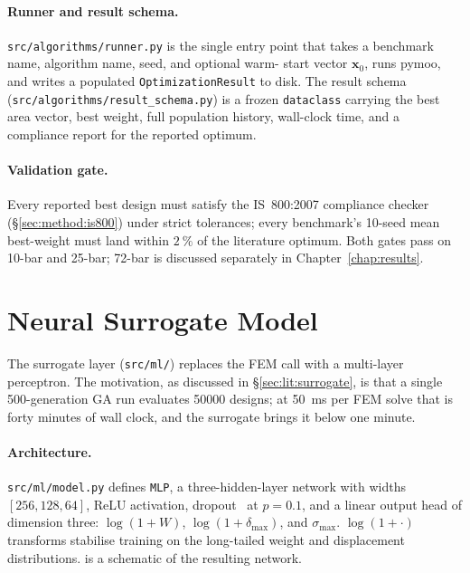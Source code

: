 \paragraph{Runner and result schema.}
\texttt{src/algorithms/runner.py} is the single entry point that
takes a benchmark name, algorithm name, seed, and optional warm-
start vector $\mathbf{x}_0$, runs pymoo, and writes a populated
\texttt{OptimizationResult} to disk. The result schema
(\texttt{src/algorithms/result\_schema.py}) is a frozen
\texttt{dataclass} carrying the best area vector, best weight,
full population history, wall-clock time, and a compliance report
for the reported optimum.

\paragraph{Validation gate.} Every reported best design must
satisfy the IS~800:2007 compliance checker
(\S\ref{sec:method:is800}) under strict tolerances; every
benchmark's \num{10}-seed mean best-weight must land within
$\num{2}~\%$ of the literature optimum. Both gates pass on 10-bar
and 25-bar; 72-bar is discussed separately in
Chapter~\ref{chap:results}.

\section{Neural Surrogate Model}
\label{sec:method:surrogate}

The surrogate layer (\texttt{src/ml/}) replaces the FEM call with
a multi-layer perceptron. The motivation, as discussed in
\S\ref{sec:lit:surrogate}, is that a single 500-generation GA run
evaluates \num{50000} designs; at \num{50}~ms per FEM solve that is
forty minutes of wall clock, and the surrogate brings it below one
minute.

\paragraph{Architecture.} \texttt{src/ml/model.py} defines
\texttt{MLP}, a three-hidden-layer network with widths
$[\num{256}, \num{128}, \num{64}]$, ReLU activation,
dropout~\cite{goodfellow2016dl} at $p=\num{0.1}$, and a linear
output head of dimension three: $\log(1+W)$,
$\log(1+\delta_\text{max})$, and $\sigma_\text{max}$.
$\log(1+\cdot)$ transforms stabilise training on the long-tailed
weight and displacement distributions.
 is a schematic of the resulting
network.


